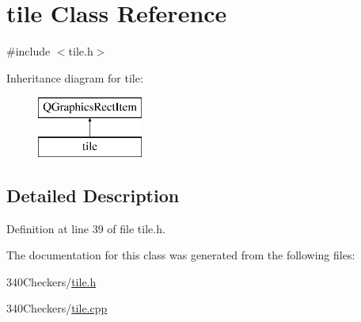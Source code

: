 \hypertarget{classtile}{\section{tile Class Reference}
\label{classtile}
}


{\ttfamily \#include $<$tile.\-h$>$}

Inheritance diagram for tile\-:\begin{figure}[H]
\begin{center}
\leavevmode
\includegraphics[height=2.000000cm]{classtile}
\end{center}
\end{figure}


\subsection{Detailed Description}


Definition at line 39 of file tile.\-h.



The documentation for this class was generated from the following files\-:\begin{DoxyCompactItemize}
\item 
340\-Checkers/\hyperlink{tile_8h}{tile.\-h}\item 
340\-Checkers/\hyperlink{tile_8cpp}{tile.\-cpp}\end{DoxyCompactItemize}
